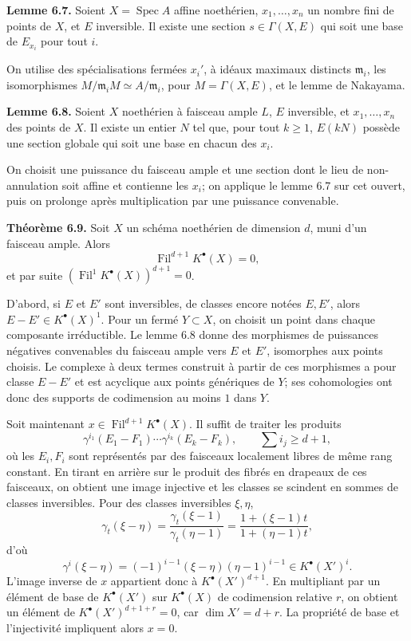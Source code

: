 \documentclass[11pt]{article}
\newcommand{\Fil}{\operatorname{Fil}}
\newcommand{\Spec}{\operatorname{Spec}}
\begin{document}
\textbf{Lemme 6.7.} Soient \(X=\Spec A\) affine noethérien, \(x_1,\ldots,x_n\) un nombre fini de points de \(X\), et \(E\) inversible. Il existe une section \(s\in\Gamma(X,E)\) qui soit une base de \(E_{x_i}\) pour tout \(i\).

On utilise des spécialisations fermées \(x_i'\), à idéaux maximaux distincts \(\mathfrak m_i\), les isomorphismes \(M/\mathfrak m_iM\simeq A/\mathfrak m_i\), pour \(M=\Gamma(X,E)\), et le lemme de Nakayama.

\textbf{Lemme 6.8.} Soient \(X\) noethérien à faisceau ample \(L\), \(E\) inversible, et \(x_1,\ldots,x_n\) des points de \(X\). Il existe un entier \(N\) tel que, pour tout \(k\ge1\), \(E(kN)\) possède une section globale qui soit une base en chacun des \(x_i\).

On choisit une puissance du faisceau ample et une section dont le lieu de non-annulation soit affine et contienne les \(x_i\); on applique le lemme 6.7 sur cet ouvert, puis on prolonge après multiplication par une puissance convenable.

\textbf{Théorème 6.9.} Soit \(X\) un schéma noethérien de dimension \(d\), muni d'un faisceau ample. Alors
\[
  \Fil^{d+1}K^\bullet(X)=0,
\]
et par suite \((\Fil^1K^\bullet(X))^{d+1}=0\).

D'abord, si \(E\) et \(E'\) sont inversibles, de classes encore notées \(E,E'\), alors \(E-E'\in K^\bullet(X)^1\). Pour un fermé \(Y\subset X\), on choisit un point dans chaque composante irréductible. Le lemme 6.8 donne des morphismes de puissances négatives convenables du faisceau ample vers \(E\) et \(E'\), isomorphes aux points choisis. Le complexe à deux termes construit à partir de ces morphismes a pour classe \(E-E'\) et est acyclique aux points génériques de \(Y\); ses cohomologies ont donc des supports de codimension au moins \(1\) dans \(Y\).

Soit maintenant \(x\in\Fil^{d+1}K^\bullet(X)\). Il suffit de traiter les produits
\[
  \gamma^{i_1}(E_1-F_1)\cdots\gamma^{i_k}(E_k-F_k),
  \qquad \sum i_j\ge d+1,
\]
où les \(E_i,F_i\) sont représentés par des faisceaux localement libres de même rang constant. En tirant en arrière sur le produit des fibrés en drapeaux de ces faisceaux, on obtient une image injective et les classes se scindent en sommes de classes inversibles. Pour des classes inversibles \(\xi,\eta\),
\[
  \gamma_t(\xi-\eta)
  =\frac{\gamma_t(\xi-1)}{\gamma_t(\eta-1)}
  =\frac{1+(\xi-1)t}{1+(\eta-1)t},
\]
d'où
\[
  \gamma^i(\xi-\eta)=(-1)^{i-1}(\xi-\eta)(\eta-1)^{i-1}\in K^\bullet(X')^i.
\]
L'image inverse de \(x\) appartient donc à \(K^\bullet(X')^{d+1}\). En multipliant par un élément de base de \(K^\bullet(X')\) sur \(K^\bullet(X)\) de codimension relative \(r\), on obtient un élément de \(K^\bullet(X')^{d+1+r}=0\), car \(\dim X'=d+r\). La propriété de base et l'injectivité impliquent alors \(x=0\).
\end{document}
